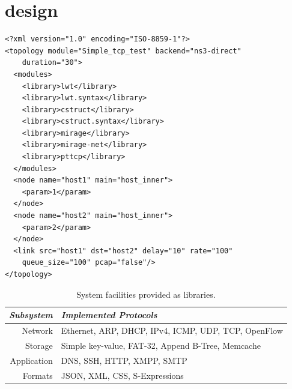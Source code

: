 \section{\sdnsim design} \label{sec:sdnsim-design}

\lstset{language=XML,
numberstyle=\footnotesize,
basicstyle=\ttfamily\footnotesize,
captionpos=b,
}
\begin{lstlisting}[caption={A sample \sdnsim configuration file interconnecting
  a server and a client host},label={lst:sdnsim-conf}]
<?xml version="1.0" encoding="ISO-8859-1"?>
<topology module="Simple_tcp_test" backend="ns3-direct" 
    duration="30">
  <modules>
    <library>lwt</library>
    <library>lwt.syntax</library>
    <library>cstruct</library>
    <library>cstruct.syntax</library>
    <library>mirage</library>
    <library>mirage-net</library>
    <library>pttcp</library>
  </modules>
  <node name="host1" main="host_inner"> 
    <param>1</param>
  </node>
  <node name="host2" main="host_inner"> 
    <param>2</param>
  </node>
  <link src="host1" dst="host2" delay="10" rate="100" 
    queue_size="100" pcap="false"/>
</topology>
\end{lstlisting}

\begin{table}
\centering
\begin{tabular}{r|p{}}
\emph{Subsystem} & \emph{Implemented Protocols} \\
\hline 
Network     & Ethernet, ARP, DHCP, IPv4, ICMP, UDP, TCP, OpenFlow\\ 
Storage     & Simple key-value, FAT-32, Append B-Tree, Memcache \\
Application & DNS, SSH, HTTP, XMPP, SMTP  \\ 
Formats     & JSON, XML, CSS, S-Expressions\\
\end{tabular}
\caption{\label{t:facilities}System facilities provided as \mirage{}
        libraries.}
\end{table}

